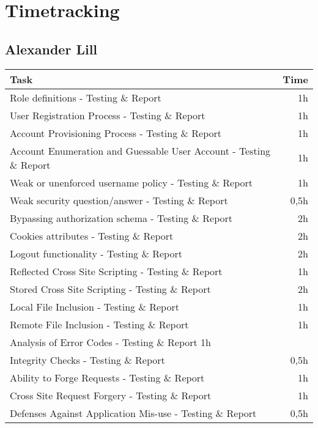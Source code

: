 \chapter{Timetracking}\label{chapter:timetracking}
\section*{Alexander Lill}
\begin{table}[h!tpb]
  \centering
  \begin{tabularx}{\textwidth}{X r}
    \toprule
      Task & Time \\
    \midrule
    Role definitions - Testing \& Report & 1h \\
    User Registration Process - Testing \& Report & 1h \\
    Account Provisioning Process - Testing \& Report & 1h \\
    Account Enumeration and Guessable User Account - Testing \& Report & 1h \\
    Weak or unenforced username policy - Testing \& Report & 1h \\
    Weak security question/answer - Testing \& Report & 0,5h \\
    Bypassing authorization schema - Testing \& Report & 2h \\
    Cookies attributes - Testing \& Report & 2h \\
    Logout functionality - Testing \& Report & 2h \\
    Reflected Cross Site Scripting - Testing \& Report & 1h \\
    Stored Cross Site Scripting - Testing \& Report & 2h \\
    Local File Inclusion - Testing \& Report & 1h \\
    Remote File Inclusion - Testing \& Report & 1h \\
    Analysis of Error Codes - Testing \& Report 1h \\
    Integrity Checks - Testing \& Report & 0,5h \\
    Ability to Forge Requests - Testing \& Report & 1h \\
    Cross Site Request Forgery - Testing \& Report & 1h \\
    Defenses Against Application Mis-use - Testing \& Report & 0,5h \\

\end{tabularx}
\end{table}
